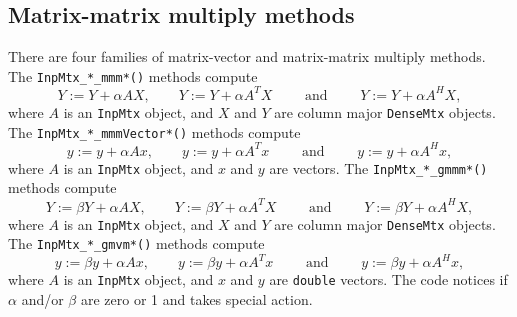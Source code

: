 \subsection{Matrix-matrix multiply methods}
\label{subsection:InpMtx:proto:mvm}
\par
There are four families of matrix-vector and matrix-matrix multiply
methods.
The {\tt InpMtx\_*\_mmm*()} methods compute
$$
Y := Y + \alpha A X, \qquad
Y := Y + \alpha A^T X \qquad \mbox{\ and\ } \qquad
Y := Y + \alpha A^H X,
$$
where $A$ is an {\tt InpMtx} object, and $X$ and $Y$ are column
major {\tt DenseMtx} objects.
The {\tt InpMtx\_*\_mmmVector*()} methods compute
$$
y := y + \alpha A x, \qquad
y := y + \alpha A^T x \qquad \mbox{\ and\ } \qquad
y := y + \alpha A^H x,
$$
where $A$ is an {\tt InpMtx} object, and $x$ and $y$ are vectors.
The {\tt InpMtx\_*\_gmmm*()} methods compute
$$
Y := \beta Y + \alpha A X, \qquad
Y := \beta Y + \alpha A^T X \qquad \mbox{\ and\ } \qquad
Y := \beta Y + \alpha A^H X,
$$
where $A$ is an {\tt InpMtx} object, and $X$ and $Y$ are column
major {\tt DenseMtx} objects.
The {\tt InpMtx\_*\_gmvm*()} methods compute
$$
y := \beta y + \alpha A x, \qquad
y := \beta y + \alpha A^T x \qquad \mbox{\ and\ } \qquad
y := \beta y + \alpha A^H x,
$$
where $A$ is an {\tt InpMtx} object, and $x$ and $y$ are 
{\tt double} vectors.
The code notices if $\alpha$ and/or $\beta$ are zero or 1 
and takes special action.
\par
